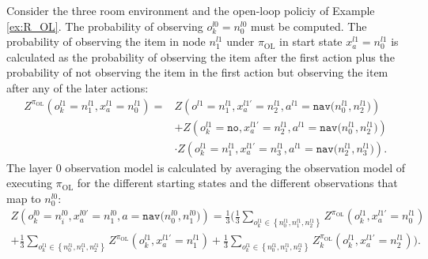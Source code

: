 \begin{example}
Consider the three room environment and the open-loop policiy of Example \ref{ex:R_OL}. The probability of observing $o_k^{l0}=n_0^{l0}$ must be computed. The probability of observing the item in node $n_1^{l1}$ under $\pi_\text{OL}$ in start state $x_{a}^{l1}=n_0^{l1}$ is calculated as the probability of observing the item after the first action plus the probability of not observing the item in the first action but observing the item after any of the later actions:
\begin{equation}
    \begin{aligned}
        Z^{\pi_\text{OL}}\left( o_k^{l1}=n_1^{l1},x_{a}^{l1}=n_0^{l1} \right) = &Z\left(o^{l1}=n_1^{l1}, x_a^{l1\prime}=n_2^{l1}, a^{l1}=\texttt{nav($n_0^{l1}, n_2^{l1}$)} \right)\\
        &+ Z\left(o_k^{l1}=\texttt{no}, x_a^{l1\prime}=n_2^{l1}, a^{l1}=\texttt{nav($n_0^{l1}, n_2^{l1}$)} \right)\\
        &\cdot Z\left(o_k^{l1}=n_1^{l1}, x_a^{l1\prime}=n_3^{l1}, a^{l1}=\texttt{nav($n_2^{l1}, n_3^{l1}$)} \right).
    \end{aligned}
\end{equation}
The layer 0 observation model is calculated by averaging the observation model of executing $\pi_\text{OL}$ for the different starting states and the different observations that map to $n_0^{l0}$:
\begin{multline}
Z\left(o_k^{l0}=n_i^{l0},x_a^{l0\prime}=n_1^{l0}, a=\texttt{nav($n_0^{l0}, n_1^{l0}$)}\right) = \frac{1}{3}\bigg( \frac{1}{3}\sum_{o_k^{l1}\in\left\{n_0^{l1},n_1^{l1},n_2^{l1}\right\}} Z^{\pi_\text{OL}}\left( o_k^{l1},x_{a}^{l1\prime}=n_0^{l1} \right)\\
+\frac{1}{3}\sum_{o_k^{l1}\in\left\{n_0^{l1},n_1^{l1},n_2^{l1}\right\}} Z^{\pi_\text{OL}}\left( o_k^{l1},x_{a}^{l1\prime}=n_1^{l1} \right)     +\frac{1}{3}\sum_{o_k^{l1}\in\left\{n_0^{l1},n_1^{l1},n_2^{l1}\right\}} Z_k^{\pi_\text{OL}}\left( o_k^{l1},x_{a}^{l1\prime}=n_2^{l1} \right) \bigg).
\end{multline}

\end{example}

